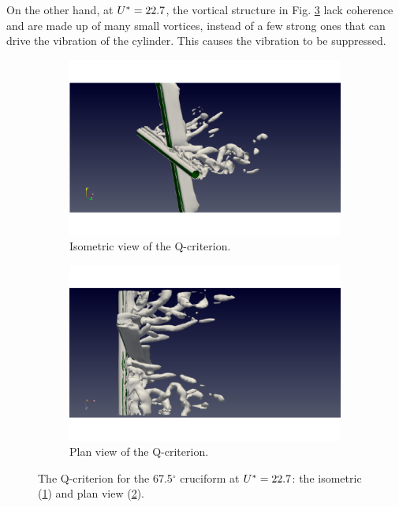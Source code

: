 \documentclass[oneside]{utmthesis}
\begin{document}
On the other hand, at $U^{*}=22.7$, the vortical structure in Fig. \ref{fig:qCrit675U10} lack coherence and are made up of many small vortices, instead of a few strong ones that can drive the vibration of the cylinder. This causes the vibration to be suppressed.

\begin{figure}[H]
  \centering
  \begin{subfigure}[h]{0.48\textwidth}
    \includegraphics[width=\textwidth,trim={1.5cm 0 3cm 0},clip]{figs/qIso675U10}
    \caption{Isometric view of the Q-criterion.}
    \label{fig:qIso675U10}
  \end{subfigure}
  \hfill
  \begin{subfigure}[h]{0.48\textwidth}
    \includegraphics[width=\textwidth,trim={1.5cm 0 3cm 0},clip]{figs/qTop675U10}
    \caption{Plan view of the Q-criterion.}
    \label{fig:qTop675U10}
  \end{subfigure}

  \caption{The Q-criterion for the 67.5$^{\circ}$ cruciform at $U^{*} = 22.7$: the isometric (\ref{fig:qIso675U10}) and plan view (\ref{fig:qTop675U10}).} \label{fig:qCrit675U10}
\end{figure}
\end{document}
